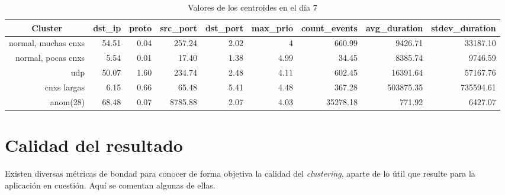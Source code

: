 \begin{table}[h!]
    \begingroup
    \setlength{\tabcolsep}{2pt} %
    \hspace*{-3cm}
    \begin{tabular}{|r|r|r|r|r|r|r|r|r|}
    \hline
    \multicolumn{1}{|c|}{\textbf{Cluster}} & \textbf{dst\_ip} & \textbf{proto} & \textbf{src\_port} & \textbf{dst\_port} & \textbf{max\_prio} & \textbf{count\_events} & \textbf{avg\_duration} & \textbf{stdev\_duration} \\ \hline
    normal, muchas cnxs                    & 54.51            & 0.04           & 257.24             & 2.02               & 4                  & 660.99                 & 9426.71                & 33187.10                 \\ \hline
    normal, pocas cnxs                     & 5.54             & 0.01           & 17.40              & 1.38               & 4.99               & 34.45                  & 8385.74                & 9746.59                  \\ \hline
    udp                                    & 50.07            & 1.60           & 234.74             & 2.48               & 4.11               & 602.45                 & 16391.64               & 57167.76                 \\ \hline
    cnxs largas                            & 6.15             & 0.66           & 65.48              & 5.41               & 4.48               & 367.28                 & 503875.35              & 735594.61                \\ \hline
    anom(28)                               & 68.48            & 0.07           & 8785.88            & 2.07               & 4.03               & 35278.18               & 771.92                 & 6427.07                  \\ \hline
    \end{tabular}
    \endgroup
\caption{Valores de los centroides en el día 7}
\label{tab:dia7}
\end{table}

\section{Calidad del resultado}\label{sec:calidadresultado}

Existen diversas métricas de bondad para conocer de forma objetiva la calidad del \emph{clustering}, aparte de lo útil que resulte para la aplicación en cuestión.
Aquí se comentan algunas de ellas.


